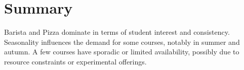 \documentclass[12pt,a4paper]{article}
\begin{document}
\section*{Summary}
Barista and Pizza dominate in terms of student interest and consistency.  
Seasonality influences the demand for some courses, notably in summer and autumn.  
A few courses have sporadic or limited availability, possibly due to resource constraints or experimental offerings.

\end{document}
